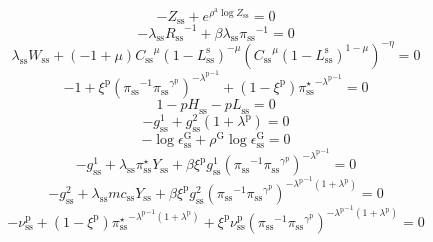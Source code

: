 \begin{equation}
-Z_\mathrm{ss} + e^{{\rho^{\mathrm{a}}} {\log{Z_\mathrm{ss}}}} = 0
\end{equation}
\begin{equation}
-{\lambda_\mathrm{ss}} {R_\mathrm{ss}}^{-1} + {\beta} {\lambda_\mathrm{ss}} {\pi_\mathrm{ss}}^{-1} = 0
\end{equation}
\begin{equation}
{\lambda_\mathrm{ss}} {W_\mathrm{ss}} + \left(-1 + \mu\right) {{C_\mathrm{ss}}^{\mu}} {\left(1 - L^{\mathrm{s}}_\mathrm{ss}\right)^{-\mu}} {\left({{C_\mathrm{ss}}^{\mu}} {\left(1 - L^{\mathrm{s}}_\mathrm{ss}\right)^{1 - \mu}}\right)^{-\eta}} = 0
\end{equation}
\begin{equation}
-1 + {\xi^{\mathrm{p}}} {\left({\pi_\mathrm{ss}}^{-1} {{\pi_\mathrm{ss}}^{\gamma^{\mathrm{p}}}}\right)^{-{\lambda^{\mathrm{p}}}^{-1}}} + \left(1 - \xi^{\mathrm{p}}\right) {{\pi^{\star}_\mathrm{ss}}^{-{\lambda^{\mathrm{p}}}^{-1}}} = 0
\end{equation}
\begin{equation}
1 - {p\!H}_\mathrm{ss} - {p\!L}_\mathrm{ss} = 0
\end{equation}
\begin{equation}
-g^{\mathrm{1}}_\mathrm{ss} + {g^{\mathrm{2}}_\mathrm{ss}} \left(1 + \lambda^{\mathrm{p}}\right) = 0
\end{equation}
\begin{equation}
-\log{\epsilon^{\mathrm{G}}_\mathrm{ss}} + {\rho^{\mathrm{G}}} {\log{\epsilon^{\mathrm{G}}_\mathrm{ss}}} = 0
\end{equation}
\begin{equation}
-g^{\mathrm{1}}_\mathrm{ss} + {\lambda_\mathrm{ss}} {\pi^{\star}_\mathrm{ss}} {Y_\mathrm{ss}} + {\beta} {\xi^{\mathrm{p}}} {g^{\mathrm{1}}_\mathrm{ss}} {\left({\pi_\mathrm{ss}}^{-1} {{\pi_\mathrm{ss}}^{\gamma^{\mathrm{p}}}}\right)^{-{\lambda^{\mathrm{p}}}^{-1}}} = 0
\end{equation}
\begin{equation}
-g^{\mathrm{2}}_\mathrm{ss} + {\lambda_\mathrm{ss}} {{m\!c}_\mathrm{ss}} {Y_\mathrm{ss}} + {\beta} {\xi^{\mathrm{p}}} {g^{\mathrm{2}}_\mathrm{ss}} {\left({\pi_\mathrm{ss}}^{-1} {{\pi_\mathrm{ss}}^{\gamma^{\mathrm{p}}}}\right)^{-{\lambda^{\mathrm{p}}}^{-1} \left(1 + \lambda^{\mathrm{p}}\right)}} = 0
\end{equation}
\begin{equation}
-\nu^{\mathrm{p}}_\mathrm{ss} + \left(1 - \xi^{\mathrm{p}}\right) {{\pi^{\star}_\mathrm{ss}}^{-{\lambda^{\mathrm{p}}}^{-1} \left(1 + \lambda^{\mathrm{p}}\right)}} + {\xi^{\mathrm{p}}} {\nu^{\mathrm{p}}_\mathrm{ss}} {\left({\pi_\mathrm{ss}}^{-1} {{\pi_\mathrm{ss}}^{\gamma^{\mathrm{p}}}}\right)^{-{\lambda^{\mathrm{p}}}^{-1} \left(1 + \lambda^{\mathrm{p}}\right)}} = 0
\end{equation}
